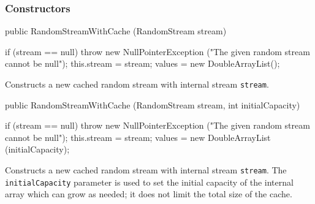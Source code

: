 \subsubsection* {Constructors}
\begin{code}

   public RandomStreamWithCache (RandomStream stream)\begin{hide} {
      if (stream == null)
         throw new NullPointerException
            ("The given random stream cannot be null");
      this.stream = stream;
      values = new DoubleArrayList();
   }\end{hide}
\end{code}
\begin{tabb}   Constructs a new cached random stream with
 internal stream \texttt{stream}.
\end{tabb}
\begin{htmlonly}
\end{htmlonly}
\begin{code}

   public RandomStreamWithCache (RandomStream stream, int initialCapacity)\begin{hide} {
      if (stream == null)
         throw new NullPointerException
            ("The given random stream cannot be null");
      this.stream = stream;
      values = new DoubleArrayList (initialCapacity);
   }\end{hide}
\end{code}
\begin{tabb}   Constructs a new cached random stream
 with internal stream \texttt{stream}.
 The \texttt{initialCapacity}
 parameter is used to set the initial capacity of the internal array
 which can grow as needed; it does not
 limit the total size of the cache.
\end{tabb}
\begin{htmlonly}
\end{htmlonly}

